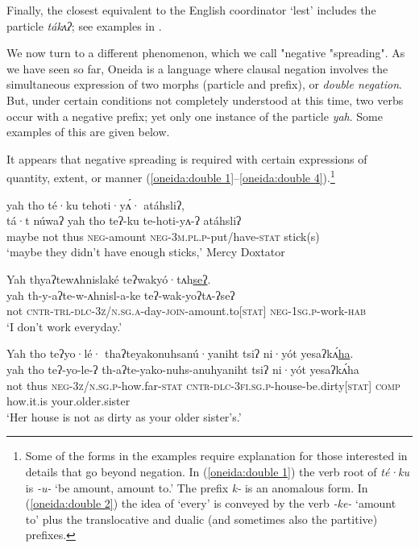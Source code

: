 \documentclass[output=paper,colorlinks,citecolor=brown]{langscibook}
\begin{document}
Finally, the closest equivalent to the English coordinator `lest' includes the particle \textit{tákʌʔ}; see examples in .

We now turn to a different phenomenon, which we call "negative "spreading". 
As we have seen so far, Oneida is a language where clausal negation involves the simultaneous expression of two morphs (particle and prefix), or \textit{double negation}. But, under certain conditions not completely understood at this time, two verbs occur with a negative prefix; yet only one instance of the particle \textit{yah}.
Some examples of this are given below.
 
It appears that negative spreading is required with certain expressions of quantity, extent, or manner (\ref{oneida:double 1}--\ref{oneida:double 4}).\footnote{Some of the forms in the examples require explanation for those interested in details that go beyond negation. In (\ref{oneida:double 1})  the verb root of \textit{té·ku} is \textit{-u-} `be  amount, amount to.' The prefix \textit{k-} is an anomalous form. In (\ref{oneida:double 2}) the idea of `every' is conveyed by the verb \textit{-ke-} `amount to' plus the translocative and dualic (and sometimes also the partitive) prefixes.}

\ea\label{oneida:double 1}
	 yah tho té·ku tehoti·yʌ́· atáhsliʔ, \\
	{tá·t núwaʔ} yah tho teʔ-ku te-hoti-yʌ-ʔ atáhsliʔ \\
	maybe not thus \textsc{neg}-amount \textsc{neg-3m.pl.p}-put/have-\textsc{stat} stick(s) \\
	\glt `maybe they didn't have enough sticks,' Mercy Doxtator \citep[258 (76)]{MichelsonEtAl2016}
\z


\ea\label{oneida:double 2}
	\glll Yah thyaʔtewʌhnislaké teʔwaky\'o·tʌh\uline{seʔ}.\\
	yah th-y-aʔte-w-ʌhnisl-a-ke teʔ-wak-yo{ʔ}tʌ-ʔseʔ\\
	not \textsc{cntr-trl-dlc-3z/n.sg.a}-day-\textsc{join}-amount.to[\textsc{stat}] \textsc{neg-1sg.p}-work-\textsc{hab} \\
	\glt `I don't work everyday.' 
\z

\ea\label{oneida:double 3}
	\glll Yah tho teʔyo·lé· thaʔteyakonuhsanú·yaniht tsiʔ ni·y\'ot yesaʔkʌ́\uline{ha}. \\
	yah tho teʔ-yo-le-ʔ th-aʔte-yako-nuhs-anuhyaniht tsiʔ ni·y\'ot yesaʔkʌ́ha \\
	not thus \textsc{neg-3z/n.sg.p}-how.far-\textsc{stat} \textsc{cntr-dlc-3fi.sg.p}-house-be.dirty\textsc{[stat]} \textsc{comp} {how.it.is} {your.older.sister} \\
	\glt `Her house is not as dirty as your older sister's.' 
\z
\end{document}

